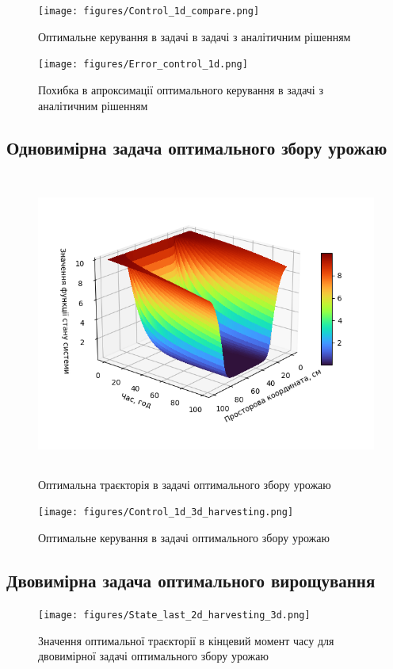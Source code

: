 \documentclass[a4paper,12pt]{extreport}
\begin{document}
\begin{figure}[H]
    \centering
\texttt{[image: figures/Control\_1d\_compare.png]}
\caption{Оптимальне керування в задачі в задачі з аналітичним рішенням}
\label{im:2.2}
\end{figure}

\begin{figure}[H]
    \centering
\texttt{[image: figures/Error\_control\_1d.png]}
\caption{Похибка в апроксимації оптимального керування в задачі з аналітичним рішенням}
\label{im:2.3}
\end{figure}

\subsection{Одновимірна задача оптимального збору урожаю}\label{ss_res:2}
\begin{figure}[H]
    \centering
\includegraphics[height=10cm, width=15cm]{figures/State_1d_task_3d_plot.png}
\caption{Оптимальна траєкторія в задачі оптимального збору урожаю}
\label{im:3.1}
\end{figure}

\begin{figure}[H]
\centering
\texttt{[image: figures/Control\_1d\_3d\_harvesting.png]}
\caption{Оптимальне керування в задачі оптимального збору урожаю}
\label{im:3.2}
\end{figure}


\subsection{Двовимірна задача оптимального вирощування}\label{ss_res:3}
\begin{figure}[H]
    \centering
\texttt{[image: figures/State\_last\_2d\_harvesting\_3d.png]}
\caption{Значення оптимальної траєкторії в кінцевий момент часу для двовимірної задачі оптимального збору урожаю}
\label{im:4.1}
\end{figure}
\end{document}
